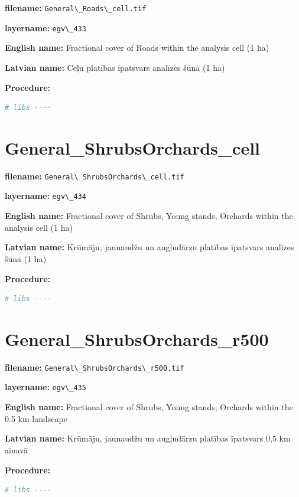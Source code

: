 \documentclass[
]{book}
\newcommand{\passthrough}[1]{#1}
\begin{document}
\textbf{filename:} \passthrough{\lstinline!General\_Roads\_cell.tif!}

\textbf{layername:} \passthrough{\lstinline!egv\_433!}

\textbf{English name:} Fractional cover of Roads within the analysis cell (1 ha)

\textbf{Latvian name:} Ceļu platības īpatsvars analīzes šūnā (1 ha)

\textbf{Procedure:}

\begin{lstlisting}[language=R]
# libs ----
\end{lstlisting}

\section{General\_ShrubsOrchards\_cell}\label{ch06.434}

\textbf{filename:} \passthrough{\lstinline!General\_ShrubsOrchards\_cell.tif!}

\textbf{layername:} \passthrough{\lstinline!egv\_434!}

\textbf{English name:} Fractional cover of Shrubs, Young stands, Orchards within the analysis cell (1 ha)

\textbf{Latvian name:} Krūmāju, jaunaudžu un augļudārzu platības īpatsvars analīzes šūnā (1 ha)

\textbf{Procedure:}

\begin{lstlisting}[language=R]
# libs ----
\end{lstlisting}

\section{General\_ShrubsOrchards\_r500}\label{ch06.435}

\textbf{filename:} \passthrough{\lstinline!General\_ShrubsOrchards\_r500.tif!}

\textbf{layername:} \passthrough{\lstinline!egv\_435!}

\textbf{English name:} Fractional cover of Shrubs, Young stands, Orchards within the 0.5 km landscape

\textbf{Latvian name:} Krūmāju, jaunaudžu un augļudārzu platības īpatsvars 0,5 km ainavā

\textbf{Procedure:}

\begin{lstlisting}[language=R]
# libs ----
\end{lstlisting}
\end{document}
